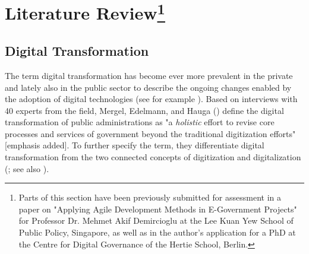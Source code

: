 \section[Literature Review]{Literature Review\footnote{Parts of this section have been previously submitted for assessment in a paper on "Applying Agile Development Methods in E-Government Projects" for Professor Dr. Mehmet Akif Demircioglu at the Lee Kuan Yew School of Public Policy, Singapore, as well as in the author's application for a PhD at the Centre for Digital Governance of the Hertie School, Berlin.}}
\subsection{Digital Transformation}\label{Digital Transformation}
The term digital transformation has become ever more prevalent in the private and lately also in the public sector to describe the ongoing changes enabled by the adoption of digital technologies (see for example \cite{McKinsey2018,BehordenSpiegel2020,Tabrizi2019}). Based on interviews with 40 experts from the field, Mergel, Edelmann, and Hauga (\cite*[p. 12]{Mergel2019a}) define the digital transformation of public administrations as "a \textit{holistic} effort to revise core processes and services of government beyond the traditional digitization efforts" [emphasis added]. To further specify the term, they differentiate digital transformation from the two connected concepts of digitization and digitalization (\cite{Mergel2019a}; see also \cite{Bloomberg2018, Brennen2015}).\par 

